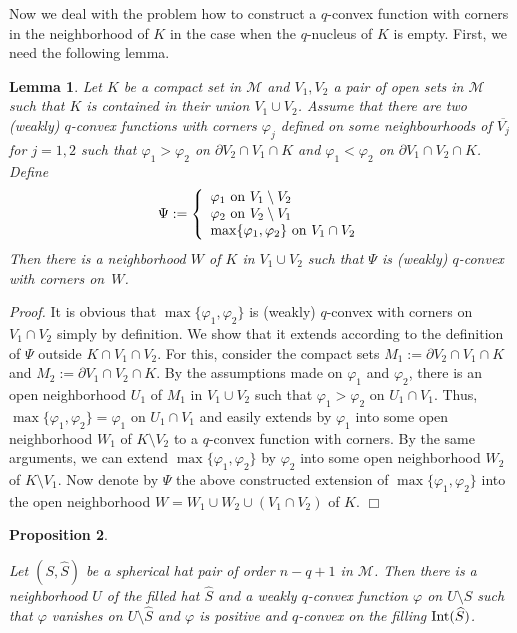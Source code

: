 \documentclass[11pt,a4paper]{article}
\newtheorem{lem}{Lemma}[section]
\newtheorem{prop}[lem]{Proposition}
\newenvironment{proof}{\noindent\textit{Proof. }}{\hfill $\Box$\linebreak}
\newcommand{\Mcal}{\mathcal{M}}
\newcommand{\Int}{\hbox{Int}}
\begin{document}
Now we deal with the problem how to construct a $q$-convex function with corners in the neighborhood of $K$ in the case when the $q$-nucleus of $K$ is empty. First, we need the following lemma.

\begin{lem}\label{lem-glue-qcvx} Let $K$ be a compact set in $\Mcal$ and $V_1, V_2$ a pair of open sets in $\Mcal$ such that $K$ is contained in their union $V_1 \cup V_2$. Assume that there are two (weakly) $q$-convex functions with corners $\varphi_j$ defined on some neighbourhoods of $\overline{V_j}$ for $j=1,2$ such that $\varphi_1>\varphi_2$ on $\partial V_2 \cap V_1 \cap K$ and $\varphi_1<\varphi_2$ on $\partial V_1 \cap V_2 \cap K$. Define
\[
\Psi:=\left\{ \begin{array}{l} 
\varphi_1 \ \hbox{on}\ V_1\setminus V_2 \\
\varphi_2 \ \hbox{on}\ V_2\setminus V_1 \\
\max\{\varphi_1,\varphi_2\} \ \hbox{on}\ V_1 \cap V_2
\end{array}\right.
\]
Then there is a neighborhood $W$ of $K$ in $V_1 \cup V_2$ such that $\Psi$ is (weakly) $q$-convex with corners on~$W$.
\end{lem}

\begin{proof} It is obvious that $\max\{\varphi_1,\varphi_2\}$ is (weakly) $q$-convex with corners on $V_1\cap V_2$ simply by definition. We show that it extends according to the definition of $\Psi$ outside $K \cap V_1 \cap V_2$. For this, consider the compact sets $M_1:= \partial V_2 \cap V_1 \cap K$ and $M_2:= \partial V_1 \cap V_2 \cap K$. By the assumptions made on $\varphi_1$ and $\varphi_2$, there is an open neighborhood $U_1$ of $M_1$ in $V_1 \cup V_2$ such that $\varphi_1>\varphi_2$ on $U_1 \cap V_1$. Thus, $\max\{\varphi_1,\varphi_2\}=\varphi_1$ on $U_1 \cap V_1$ and easily extends by $\varphi_1$ into some open neighborhood $W_1$ of $K \setminus V_2$ to a $q$-convex function with corners. By the same arguments, we can extend $\max\{\varphi_1,\varphi_2\}$ by $\varphi_2$ into some open neighborhood $W_2$ of $K \setminus V_1$. Now denote by $\Psi$ the above constructed extension of $\max\{\varphi_1,\varphi_2\}$ into the open neighborhood $W=W_1 \cup W_2 \cup (V_1 \cap V_2)$ of $K$.
\end{proof}



\begin{prop}\label{hat-q-convex} 

Let $(S,\widehat{S})$ be a spherical hat pair of order $n-q+1$ in $\Mcal$. Then there is a neighborhood $U$ of the filled hat $\widehat{S}$ and a weakly $q$-convex function $\varphi$ on $U\setminus S$ such that $\varphi$ vanishes on $U\setminus \widehat{S}$ and $\varphi$ is positive and $q$-convex on the filling $\Int(\widehat{S})$.

\end{prop} 
\end{document}
